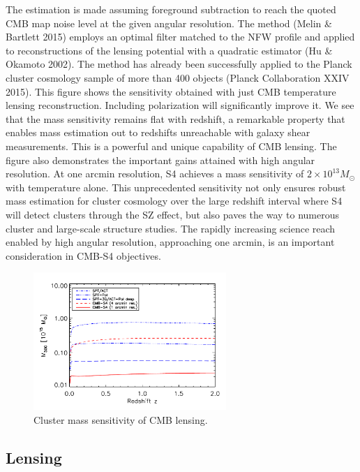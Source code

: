 	The estimation is made assuming foreground subtraction to reach the quoted CMB map noise level at the given angular resolution.  The method (Melin \& Bartlett 2015) employs an optimal filter matched to the NFW profile and applied to reconstructions of the lensing potential with a quadratic estimator (Hu \& Okamoto 2002).  The method has already been successfully applied to the Planck cluster cosmology sample of more than 400 objects (Planck Collaboration XXIV 2015).  This figure shows the sensitivity obtained with just CMB temperature lensing reconstruction.  Including polarization will significantly improve it.  
	We see that the mass sensitivity remains flat with redshift, a remarkable property that enables mass estimation out to redshifts unreachable with galaxy shear measurements.  This is a powerful and unique capability of CMB lensing.  The figure also demonstrates the important gains attained with high angular resolution.  At one arcmin resolution, S4 achieves a mass sensitivity of $2 \times 10^{13}M_\odot$ with temperature alone.  This unprecedented sensitivity not only ensures robust mass estimation for cluster cosmology over the large redshift interval where S4 will detect clusters through the SZ effect, but also paves the way to numerous cluster and large-scale structure studies.  The rapidly increasing science reach enabled by high angular resolution, approaching one arcmin, is an important consideration in CMB-S4 objectives.  

\begin{figure}[t!]
\begin{center}
\includegraphics[width=0.65\textwidth]{DarkEnergy/m500lim_vs_z_1sigma_cmbs4_v1.pdf}
\caption{Cluster mass sensitivity of CMB lensing.}
\label{fig:limits}
\end{center}
\end{figure} 

\subsection{Lensing}


